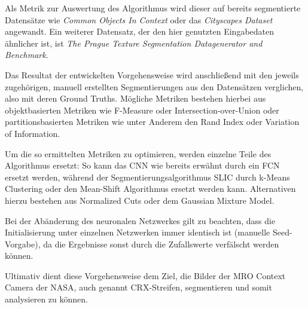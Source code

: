 \documentclass[a4paper,twocolumn,abstract,DIV=16]{scrartcl}
\begin{document}
Als Metrik zur Auswertung des Algorithmus wird dieser auf bereits segmentierte Datensätze wie \textit{Common Objects In Context}\cite{LMBHPRDZ:ECCV:2014} oder das \textit{Cityscapes Dataset}\cite{Cordts2016Cityscapes} angewandt. Ein weiterer Datensatz, der den hier genutzten Eingabedaten ähnlicher ist, ist \textit{The Prague Texture Segmentation Datagenerator and Benchmark}\cite{mikevs2015benchmarking}.

Das Resultat der entwickelten Vorgehensweise wird anschließend mit den jeweils zugehörigen, manuell erstellten Segmentierungen aus den Datensätzen verglichen, also mit deren Ground Truths. Mögliche Metriken bestehen hierbei aus objektbasierten Metriken wie F-Measure oder Intersection-over-Union oder partitionsbasierten Metriken wie unter Anderem den Rand Index\cite{randindex} oder Variation of Information\cite{meila2003comparing}.

Um die so ermittelten Metriken zu optimieren, werden einzelne Teile des Algorithmus ersetzt: So kann das CNN wie bereits erwähnt durch ein FCN ersetzt werden, während der Segmentierungsalgorithmus SLIC durch k-Means Clustering oder den Mean-Shift Algorithmus ersetzt werden kann.\cite{2019arXiv190603359A} Alternativen hierzu bestehen aus Normalized Cuts\cite{shi2000normalized} oder dem Gaussian Mixture Model\cite{8360143}.

Bei der Abänderung des neuronalen Netzwerkes gilt zu beachten, dass die Initialisierung unter einzelnen Netzwerken immer identisch ist (manuelle Seed-Vorgabe), da die Ergebnisse sonst durch die Zufallswerte verfälscht werden können.

Ultimativ dient diese Vorgehensweise dem Ziel, die Bilder der MRO Context Camera der NASA\cite{doi:10.1029/2006JE002808}, auch genannt CRX-Streifen, segmentieren und somit analysieren zu können.

\renewcommand\refname{Referenzen}

\end{document}
